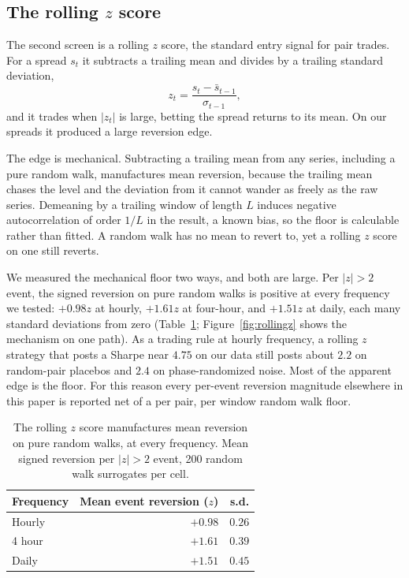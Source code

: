 \documentclass[11pt]{article}
\begin{document}
\subsection{The rolling $z$ score}
\label{sec:rollingz}

The second screen is a rolling $z$ score, the standard entry signal for pair trades. For a
spread $s_t$ it subtracts a trailing mean and divides by a trailing standard deviation,
\[
z_t = \frac{s_t - \bar{s}_{t-1}}{\sigma_{t-1}},
\]
and it trades when $|z_t|$ is large, betting the spread returns to its mean. On our spreads it
produced a large reversion edge.

The edge is mechanical. Subtracting a trailing mean from any series, including a pure random
walk, manufactures mean reversion, because the trailing mean chases the level and the deviation
from it cannot wander as freely as the raw series. Demeaning by a trailing window of length $L$
induces negative autocorrelation of order $1/L$ in the result, a known bias, so the floor is
calculable rather than fitted. A random walk has no mean to revert to, yet
a rolling $z$ score on one still reverts.

We measured the mechanical floor two ways, and both are large. Per $|z|>2$ event, the signed
reversion on pure random walks is positive at every frequency we tested: $+0.98z$ at hourly,
$+1.61z$ at four-hour, and $+1.51z$ at daily, each many standard deviations from zero
(Table~\ref{tab:rollingz}; Figure~\ref{fig:rollingz} shows the mechanism on one path). As a trading rule at hourly frequency, a rolling $z$ strategy that
posts a Sharpe near $4.75$ on our data still posts about $2.2$ on random-pair placebos and $2.4$ on
phase-randomized noise. Most of the apparent edge is the floor. For this reason every per-event
reversion magnitude elsewhere in this paper is reported net of a per pair, per window
random walk floor.

\begin{table}[h]
\centering
\caption{The rolling $z$ score manufactures mean reversion on pure random walks, at every
frequency. Mean signed reversion per $|z|>2$ event, 200 random walk surrogates per cell.}
\label{tab:rollingz}
\begin{tabular}{lrr}
\toprule
Frequency & Mean event reversion ($z$) & s.d. \\
\midrule
Hourly & $+0.98$ & $0.26$ \\
4 hour & $+1.61$ & $0.39$ \\
Daily  & $+1.51$ & $0.45$ \\
\bottomrule
\end{tabular}
\end{table}
\end{document}
